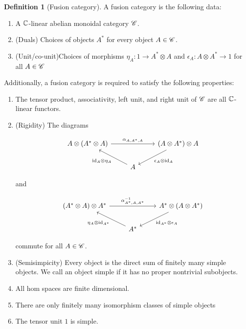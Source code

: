 \documentclass{article}
\theoremstyle{definition}
\newtheorem*{definition}{Definition}
\numberwithin{figure}{section}
\begin{document}
\begin{definition}[Fusion category]  A fusion category is the following data:

\begin{enumerate}
\item A $\mathbb{C}$-linear abelian monoidal category $\mathscr{C}$.
\item (Duals) Choices of objects $A^*$ for every object $A\in \mathscr{C}$.
\item (Unit/co-unit)Choices of morphisms $\eta_A: 1\to A^*\otimes A$ and $\epsilon_A: A\otimes A^*\to 1$ for all $A\in \mathscr{C}$
\end{enumerate}

Additionally, a fusion category is required to satisfy the following properties:

\begin{enumerate}
\item The tensor product, associativity, left unit, and right unit of $\mathscr{C}$ are all $\mathbb{C}$-linear functors.
\item (Rigidity) The diagrams

\[\begin{tikzcd}
	{A\otimes (A^*\otimes A)} && {(A\otimes A^*)\otimes A} \\
	& A
	\arrow["{\epsilon_A\otimes \text{id}_A}", from=1-3, to=2-2]
	\arrow["{\text{id}_A\otimes\eta_{A}}", from=2-2, to=1-1]
	\arrow["{\alpha_{A,A^*,A}}", from=1-1, to=1-3]
\end{tikzcd}\]

and

\[\begin{tikzcd}
	{(A^*\otimes A)\otimes A^*} && {A^*\otimes (A\otimes A^*)} \\
	& {A^*}
	\arrow["{\text{id}_{A^*}\otimes\epsilon_A}", from=1-3, to=2-2]
	\arrow["{\eta_{A}\otimes \text{id}_{A^*}}", from=2-2, to=1-1]
	\arrow["{\alpha^{-1}_{A^*,A,A^*}}", from=1-1, to=1-3]
\end{tikzcd}\]

commute for all $A\in \mathscr{C}$.

\item (Semisimpicity) Every object is the direct sum of finitely many simple objects. We call an object simple if it has no proper nontrivial subobjects.
\item All hom spaces are finite dimensional.
\item There are only finitely many isomorphism classes of simple objects
\item The tensor unit $1$ is simple.
\end{enumerate}
\raggedleft\qedsymbol{}
\end{definition}
\end{document}
